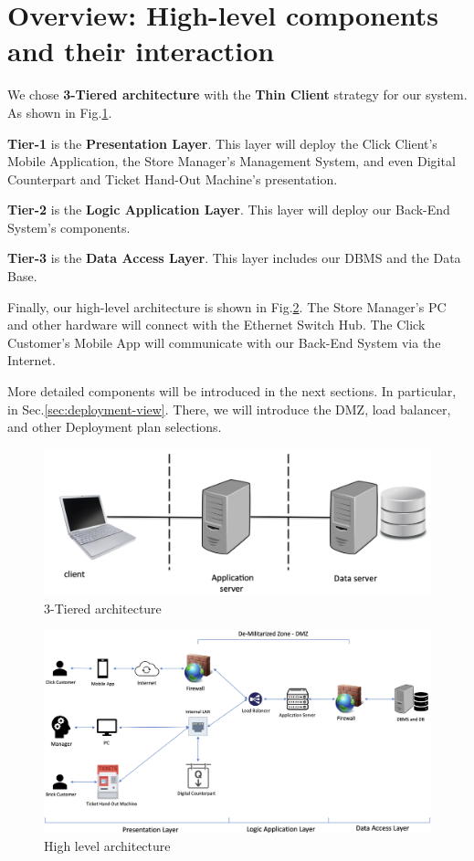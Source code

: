 \documentclass[a4paper,12pt]{report}
\begin{document}
\section{Overview: High-level components and their interaction}\label{sec:ArchitectureOverview}

We chose \textbf{3-Tiered architecture} with the \textbf{Thin Client} strategy for our system.
As shown in Fig.\ref{fig:ThreeTieredArchitecture}.\cite{SistemiInformativi}

\textbf{Tier-1} is the \textbf{Presentation Layer}.
This layer will deploy the Click Client's Mobile Application,
the Store Manager's Management System,
and even Digital Counterpart and Ticket Hand-Out Machine's presentation.

\textbf{Tier-2} is the \textbf{Logic Application Layer}.
This layer will deploy our Back-End System's components.

\textbf{Tier-3} is the \textbf{Data Access Layer}.
This layer includes our DBMS and the Data Base.

Finally, our high-level architecture is shown in Fig.\ref{fig:HighLevelArchitecture}.
The Store Manager's PC and other hardware will connect with the Ethernet Switch Hub.
The Click Customer's Mobile App will communicate with our Back-End System via the Internet.

More detailed components will be introduced in the next sections.
In particular, in Sec.\ref{sec:deployment-view}.
There, we will introduce the DMZ, load balancer, and other Deployment plan selections.

\begin{figure}
	\centering
	\includegraphics[scale=0.7]{ThreeTiered}
	\caption{3-Tiered architecture}
	\centering
	\label{fig:ThreeTieredArchitecture}
\end{figure}

\begin{figure}
	\centering
	\includegraphics[scale=0.31]{HighLevelArchitecture}
	\caption{High level architecture}
	\centering
	\label{fig:HighLevelArchitecture}
\end{figure}
\end{document}
